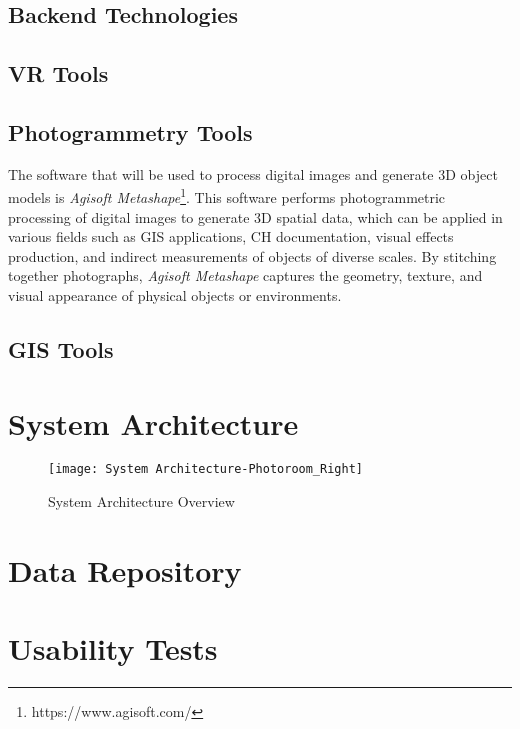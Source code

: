 \subsection{Backend Technologies}
\label{sec:backend} 

\subsection{VR Tools}
\label{sec:vr_tools} 


\subsection{Photogrammetry Tools}
\label{sec:photogrammetry_tool} 

The software that will be used to process digital images and generate \gls{3D} object models is \textit{Agisoft Metashape}\footnote{https://www.agisoft.com/}.
This software performs photogrammetric processing of digital images to generate \gls{3D} spatial data, which can be applied in various fields such as \gls{GIS} applications, \gls{CH} documentation, visual effects production, and indirect measurements of objects of diverse scales. 
By stitching together photographs, \textit{Agisoft Metashape} captures the geometry, texture, and visual appearance of physical objects or environments.
\subsection{GIS Tools}
\label{sec:gis} 


\section{System Architecture}
\label{sec:architecture}


\begin{figure}[h!]
    \centering
    \texttt{[image: System Architecture-Photoroom\_Right]}
    \caption{System Architecture Overview}
    \label{fig:architecture}
  \end{figure}
  \FloatBarrier


\section{Data Repository}
\label{sec:data_repository}


\section{Usability Tests}
\label{sec:usability_tests}



